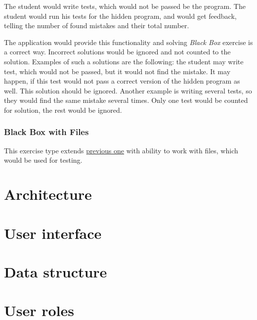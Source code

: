         The student would write tests, which would not be passed be the program. The student would run his tests for the hidden program, and would get feedback, telling the number of found mistakes and their total number.
        
        The application would provide this functionality and solving \textit{Black Box} exercise is a correct way. Incorrect solutions would be ignored and not counted to the solution. Examples of such a solutions are the following: the student may write test, which would not be passed, but it would not find the mistake. It may happen, if this test would not pass a correct version of the hidden program as well. This solution should be ignored. Another example is writing several tests, so they would find the same mistake several times. Only one test would be counted for solution, the rest would be ignored.
        
        
        \subsubsection{Black Box with Files}
        This exercise type extends \hyperref[subsubsec:blackbox]{previous one} with ability to work with files, which would be used for testing.


\section{Architecture}

\section{User interface}

\section{Data structure}

\section{User roles}
